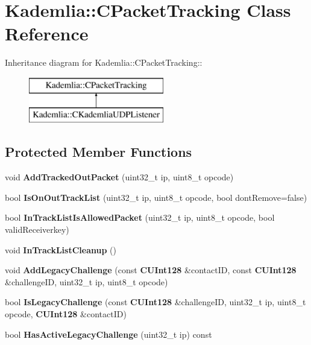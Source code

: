 \section{Kademlia::CPacketTracking Class Reference}
\label{classKademlia_1_1CPacketTracking}
Inheritance diagram for Kademlia::CPacketTracking::\begin{figure}[H]
\begin{center}
\leavevmode
\includegraphics[height=2cm]{classKademlia_1_1CPacketTracking}
\end{center}
\end{figure}
\subsection*{Protected Member Functions}
\begin{DoxyCompactItemize}
\item 
void {\bfseries AddTrackedOutPacket} (uint32\_\-t ip, uint8\_\-t opcode)\label{classKademlia_1_1CPacketTracking_a3733a18d8cbdc0601e12a130629a5ffe}

\item 
bool {\bfseries IsOnOutTrackList} (uint32\_\-t ip, uint8\_\-t opcode, bool dontRemove=false)\label{classKademlia_1_1CPacketTracking_a445ea2852888de625e1ecc228e65968c}

\item 
bool {\bfseries InTrackListIsAllowedPacket} (uint32\_\-t ip, uint8\_\-t opcode, bool validReceiverkey)\label{classKademlia_1_1CPacketTracking_ae368316411068ca52cabf2e742a104e5}

\item 
void {\bfseries InTrackListCleanup} ()\label{classKademlia_1_1CPacketTracking_a4319a635c45813c490fd865f5f02dc9b}

\item 
void {\bfseries AddLegacyChallenge} (const {\bf CUInt128} \&contactID, const {\bf CUInt128} \&challengeID, uint32\_\-t ip, uint8\_\-t opcode)\label{classKademlia_1_1CPacketTracking_ae80c075d84597150ba40f0a78c96620e}

\item 
bool {\bfseries IsLegacyChallenge} (const {\bf CUInt128} \&challengeID, uint32\_\-t ip, uint8\_\-t opcode, {\bf CUInt128} \&contactID)\label{classKademlia_1_1CPacketTracking_ae8179d4ab69facd5e9392b4f808713d8}

\item 
bool {\bfseries HasActiveLegacyChallenge} (uint32\_\-t ip) const \label{classKademlia_1_1CPacketTracking_aba1baa185db45ec4a59abe5c52f90139}

\end{DoxyCompactItemize}
